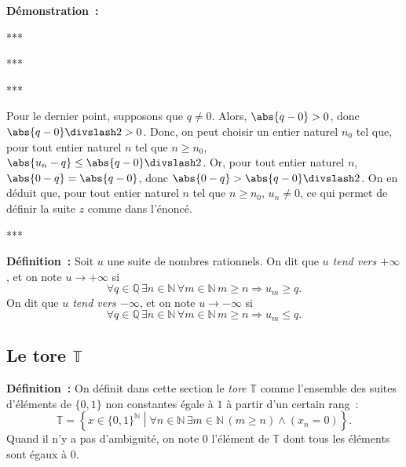 \medskip

\noindent\textbf{Démonstration :}

    ***

    ***

    ***

    Pour le dernier point, supposons que $q \neq 0$. 
    Alors, $\abs{q - 0} > 0$, donc $\abs{q - 0} \divslash 2 > 0$. 
    Donc, on peut choisir un entier naturel $n_0$ tel que, pour tout entier naturel $n$ tel que $n \geq n_0$, $\abs{u_n - q} \leq \abs{q - 0} \divslash 2$.
    Or, pour tout entier naturel $n$, $\abs{0 - q} = \abs{q - 0}$, donc $\abs{0 - q} > \abs{q - 0} \divslash 2$. 
    On en déduit que, pour tout entier naturel $n$ tel que $n \geq n_0$, $u_n \neq 0$, ce qui permet de définir la suite $z$ comme dans l'énoncé.
    
    ***

\medskip

\noindent\textbf{Définition :} Soit $u$ une suite de nombres rationnels. 
    On dit que \emph{$u$ tend vers $+\infty$}, et on note $u \rightarrow + \infty$ si
    \begin{equation*}
        \forall q \in \mathbb{Q} \, 
        \exists n \in \mathbb{N} \, 
        \forall m \in \mathbb{N} \, 
        m \geq n \Rightarrow
            u_m \geq q.
    \end{equation*}
    On dit que \emph{$u$ tend vers $-\infty$}, et on note $u \rightarrow - \infty$ si
    \begin{equation*}
        \forall q \in \mathbb{Q} \, 
        \exists n \in \mathbb{N} \, 
        \forall m \in \mathbb{N} \, 
        m \geq n \Rightarrow
            u_m \leq q.
    \end{equation*}

\subsection{Le tore \texorpdfstring{$\mathbb{T}$}{T}}

\noindent\textbf{Définition :} On définit dans cette section le \emph{tore} $\mathbb{T}$ comme l'ensemble des suites d'éléments de $\lbrace 0, 1 \rbrace$ non constantes égale à $1$ à partir d'un certain rang : 
\begin{equation*}
    \mathbb{T} = \left\lbrace
        x \in \lbrace 0, 1 \rbrace^{\mathbb{N}} 
        \middle\vert
        \forall n \in \mathbb{N} \, \exists m \in \mathbb{N} \, (m \geq n) \wedge (x_n = 0)
    \right\rbrace .
\end{equation*}
Quand il n'y a pas d'ambiguité, on note $0$ l'élément de $\mathbb{T}$ dont tous les éléments sont égaux à $0$.

